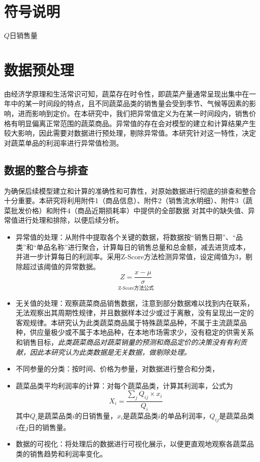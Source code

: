 \documentclass{article}
\begin{document}
\section{符号说明}

$ Q $日销售量
\section{数据预处理}

由经济学原理和生活常识可知，蔬菜存在时令性，即蔬菜产量通常呈现出集中在一年中的某一时间段的特点，且不同蔬菜品类的销售量会受到季节、气候等因素的影响，进而影响到定价。在本研究中，我们把异常值定义为在某一时间段内，销售价格有明显偏离正常范围的蔬菜商品。异常值的存在会对模型的建立和计算结果产生较大影响，因此需要对数据进行预处理，剔除异常值。本研究针对这一特性，决定对蔬菜单品的利润率进行异常值检测。
\subsection{数据的整合与排查}
为确保后续模型建立和计算的准确性和可靠性，对原始数据进行彻底的排查和整合十分重要。本研究将利用附件1（商品信息）、附件2（销售流水明细）、附件3（蔬菜批发价格）和附件4（商品近期损耗率）中提供的全部数据
对其中的缺失值、异常值进行处理和排除，以便后续分析。
\begin{itemize}
    \item 异常值的处理：从附件中提取各个关键的数据，将数据按“销售日期”、“品类”和“单品名称”进行聚合，计算每日的销售总量和总金额，减去进货成本，并进一步计算每日的利润率。采用Z-Score方法检测异常值，设定阈值为3，剔除超过该阈值的异常数据。
    \[
\underset{\text{Z-Score方法公式}}{Z = \frac{x - \mu}{\sigma}}
\]

    \item 无关值的处理：观察蔬菜商品销售数据，注意到部分数据难以找到内在联系，无法观察出其周期性规律，并且数据样本过少或过于离散，没有呈现出一定的客观规律。本研究认为此类蔬菜商品属于特殊蔬菜品种，不属于主流蔬菜品种，供应量极少或不属于本地品种，在本地市场需求少，没有稳定的供需关系和销售目标，\textit{此类蔬菜商品对蔬菜销量的预测和商品定价的决策没有有利贡献，因此本研究认为此类数据是无关数据，做剔除处理。}
    
    \item 不同参量的分类：按时间、价格为参量，对数据进行整合和分类，
    
    \item 蔬菜品类平均利润率的计算：对每个蔬菜品类，计算其利润率，公式为
    \[
X_i = \frac{\sum_j Q_{ij} \times x_i}{Q_i}
\]
其中$ Q_i$是蔬菜品类$i$的日销售量，$x_i$是蔬菜品类$i$的单品利润率，$Q_{ij}$是蔬菜品类$i$在$j$日的销售量。
    
    \item 数据的可视化：将处理后的数据进行可视化展示，以便更直观地观察各蔬菜品类的销售趋势和利润率变化。
\end{itemize}
\end{document}
